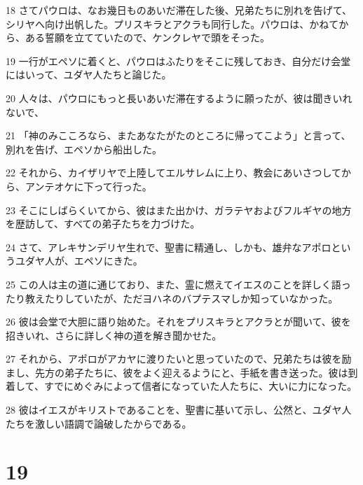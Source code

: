 \par 18 さてパウロは、なお幾日ものあいだ滞在した後、兄弟たちに別れを告げて、シリヤへ向け出帆した。プリスキラとアクラも同行した。パウロは、かねてから、ある誓願を立てていたので、ケンクレヤで頭をそった。
\par 19 一行がエペソに着くと、パウロはふたりをそこに残しておき、自分だけ会堂にはいって、ユダヤ人たちと論じた。
\par 20 人々は、パウロにもっと長いあいだ滞在するように願ったが、彼は聞きいれないで、
\par 21 「神のみこころなら、またあなたがたのところに帰ってこよう」と言って、別れを告げ、エペソから船出した。
\par 22 それから、カイザリヤで上陸してエルサレムに上り、教会にあいさつしてから、アンテオケに下って行った。
\par 23 そこにしばらくいてから、彼はまた出かけ、ガラテヤおよびフルギヤの地方を歴訪して、すべての弟子たちを力づけた。
\par 24 さて、アレキサンデリヤ生れで、聖書に精通し、しかも、雄弁なアポロというユダヤ人が、エペソにきた。
\par 25 この人は主の道に通じており、また、霊に燃えてイエスのことを詳しく語ったり教えたりしていたが、ただヨハネのバプテスマしか知っていなかった。
\par 26 彼は会堂で大胆に語り始めた。それをプリスキラとアクラとが聞いて、彼を招きいれ、さらに詳しく神の道を解き聞かせた。
\par 27 それから、アポロがアカヤに渡りたいと思っていたので、兄弟たちは彼を励まし、先方の弟子たちに、彼をよく迎えるようにと、手紙を書き送った。彼は到着して、すでにめぐみによって信者になっていた人たちに、大いに力になった。
\par 28 彼はイエスがキリストであることを、聖書に基いて示し、公然と、ユダヤ人たちを激しい語調で論破したからである。

\chapter{19}

